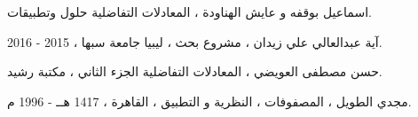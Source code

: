 \documentclass{arabicClass}
\begin{document}
	\abovedisplayskip=7pt
	\belowdisplayskip=7pt
	
	
	
	
	
	
	
	\tableofcontents
	\clearpage
	
	
	
	
	
	
	
	\begin{thebibliography}{9}
	اسماعيل بوقفه و عايش الهناودة ، المعادلات التفاضلية حلول وتطبيقات.
	
	آية عبدالعالي علي زيدان ، مشروع بحث ، ليبيا جامعة سبها ، 2015 - 2016.
	
	حسن مصطفى العويضي ، المعادلات التفاضلية الجزء الثاني ، مكتبة رشيد.
	
	مجدي الطويل ، المصفوفات ، النظرية و التطبيق ، القاهرة ، 1417 هــ - 1996 م.
	
\end{thebibliography}
\end{document}
